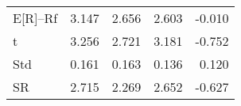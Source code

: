 \begin{tabular}{lrrrr}
\toprule
\midrule
E[R]--Rf & 3.147 & 2.656 & 2.603 & -0.010 \\
t & 3.256 & 2.721 & 3.181 & -0.752 \\
Std & 0.161 & 0.163 & 0.136 & 0.120 \\
SR & 2.715 & 2.269 & 2.652 & -0.627 \\
\bottomrule
\end{tabular}
